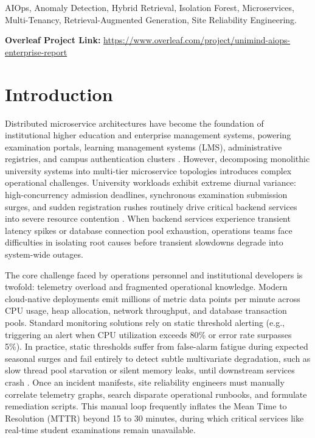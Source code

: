 \documentclass[12pt,onecolumn,draftclsnofoot]{IEEEtran}
\begin{document}
\begin{IEEEkeywords}
AIOps, Anomaly Detection, Hybrid Retrieval, Isolation Forest, Microservices, Multi-Tenancy, Retrieval-Augmented Generation, Site Reliability Engineering.
\end{IEEEkeywords}

\noindent\textbf{Overleaf Project Link:} \url{https://www.overleaf.com/project/unimind-aiops-enterprise-report}

\section{Introduction}

Distributed microservice architectures have become the foundation of institutional higher education and enterprise management systems, powering examination portals, learning management systems (LMS), administrative registries, and campus authentication clusters \cite{beyer2016site}. However, decomposing monolithic university systems into multi-tier microservice topologies introduces complex operational challenges. University workloads exhibit extreme diurnal variance: high-concurrency admission deadlines, synchronous examination submission surges, and sudden registration rushes routinely drive critical backend services into severe resource contention \cite{dang2020aiops}. When backend services experience transient latency spikes or database connection pool exhaustion, operations teams face difficulties in isolating root causes before transient slowdowns degrade into system-wide outages.

The core challenge faced by operations personnel and institutional developers is twofold: telemetry overload and fragmented operational knowledge. Modern cloud-native deployments emit millions of metric data points per minute across CPU usage, heap allocation, network throughput, and database transaction pools. Standard monitoring solutions rely on static threshold alerting (e.g., triggering an alert when CPU utilization exceeds 80\% or error rate surpasses 5\%). In practice, static thresholds suffer from false-alarm fatigue during expected seasonal surges and fail entirely to detect subtle multivariate degradation, such as slow thread pool starvation or silent memory leaks, until downstream services crash \cite{dang2020aiops}. Once an incident manifests, site reliability engineers must manually correlate telemetry graphs, search disparate operational runbooks, and formulate remediation scripts. This manual loop frequently inflates the Mean Time to Resolution (MTTR) beyond 15 to 30 minutes, during which critical services like real-time student examinations remain unavailable.
\end{document}
